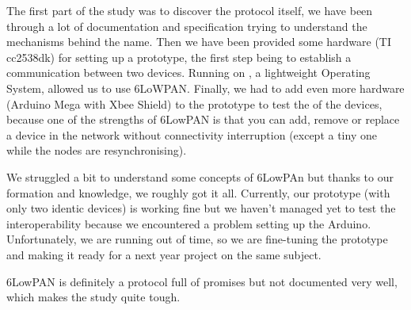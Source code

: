 {The first part of the study was to discover the protocol itself, we have been through a lot of documentation and specification trying to understand the mechanisms behind the name.
Then we have been provided some hardware (TI cc2538dk) for setting up a prototype, the first step being to establish a communication between two devices.
Running on , a lightweight Operating System, allowed us to use 6LoWPAN.
Finally, we had to add even more hardware (Arduino Mega with Xbee Shield) to the prototype to test the  of the devices, because one of the strengths of 6LowPAN is that you can add, remove or replace a device in the network without connectivity
interruption (except a tiny one while the nodes are resynchronising). 

We struggled a bit to understand some concepts of 6LowPAn but thanks to our formation and knowledge, we roughly got it all. 
Currently, our prototype (with only two identic devices) is working fine but we haven’t managed yet to test the interoperability because we encountered a problem setting up the Arduino.
Unfortunately, we are running out of time, so we are fine-tuning the prototype and making it ready for a next year project on the same subject.
 
6LowPAN is definitely a protocol full of promises but not documented very well, which makes the study quite tough.
}
